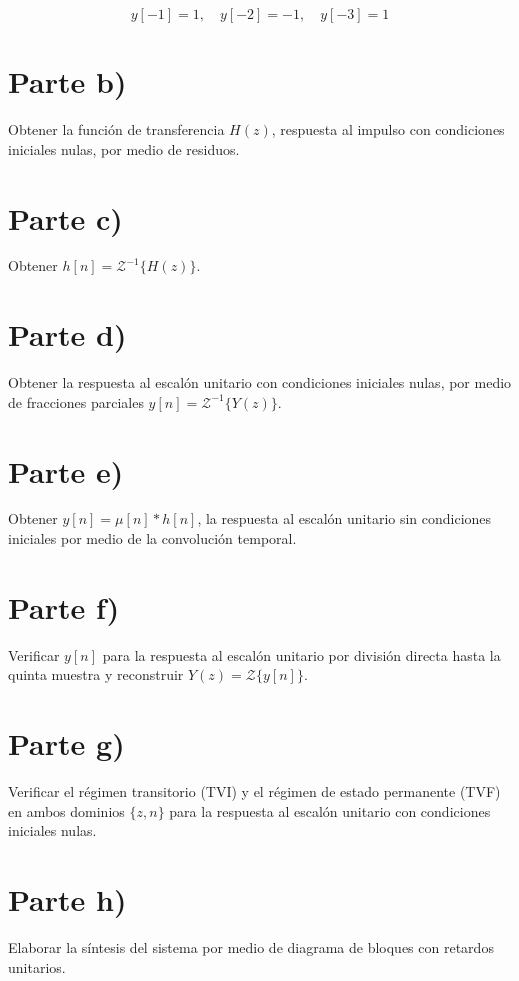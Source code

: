 \documentclass[a4paper,12pt]{report}
\begin{document}
\[
y[-1] = 1, \quad y[-2] = -1, \quad y[-3] = 1
\]

\section{Parte b)}
Obtener la función de transferencia $H(z)$, respuesta al impulso con condiciones iniciales nulas, por medio de residuos.

\section{Parte c)}
Obtener $h[n] = \mathcal{Z}^{-1}\{H(z)\}$.

\section{Parte d)}
Obtener la respuesta al escalón unitario con condiciones iniciales nulas, por medio de fracciones parciales $y[n] = \mathcal{Z}^{-1}\{Y(z)\}$.

\section{Parte e)}
Obtener $y[n] = \mu[n] * h[n]$, la respuesta al escalón unitario sin condiciones iniciales por medio de la convolución temporal.

\section{Parte f)}
Verificar $y[n]$ para la respuesta al escalón unitario por división directa hasta la quinta muestra y reconstruir $Y(z) = \mathcal{Z}\{y[n]\}$.

\section{Parte g)}
Verificar el régimen transitorio (TVI) y el régimen de estado permanente (TVF) en ambos dominios $\{z, n\}$ para la respuesta al escalón unitario con condiciones iniciales nulas.

\section{Parte h)}
Elaborar la síntesis del sistema por medio de diagrama de bloques con retardos unitarios.
\end{document}
